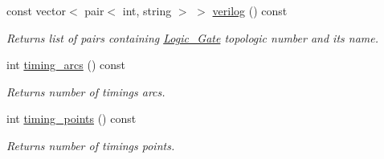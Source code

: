 \begin{DoxyCompactItemize}
const vector$<$ pair$<$ int, string $>$ $>$ \hyperlink{classCircuit__Netlist_a4638908b9a2c640b61f534edf048cdf7}{verilog} () const 
\begin{DoxyCompactList}\small\item\em Returns list of pairs containing \hyperlink{structCircuit__Netlist_1_1Logic__Gate}{Logic\-\_\-\-Gate} topologic number and its name. \end{DoxyCompactList}\item 
int \hyperlink{classCircuit__Netlist_a8ada85e3c30b4787a46c7b8396cf640a}{timing\-\_\-arcs} () const 
\begin{DoxyCompactList}\small\item\em Returns number of timings arcs. \end{DoxyCompactList}\item 
int \hyperlink{classCircuit__Netlist_a070452269f2c7109f6ca089ae34dd752}{timing\-\_\-points} () const 
\begin{DoxyCompactList}\small\item\em Returns number of timings points. \end{DoxyCompactList}\end{DoxyCompactItemize}
